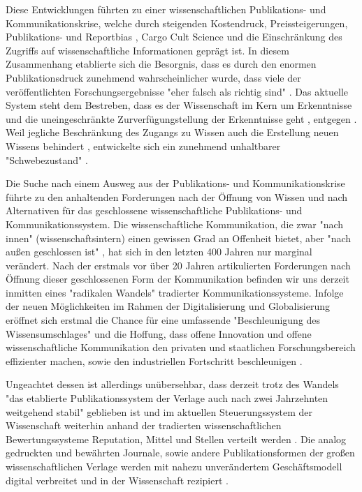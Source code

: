 Diese Entwicklungen führten zu einer wissenschaftlichen Publikations- und Kommunikationskrise, welche durch steigenden Kostendruck, Preissteigerungen, Publikations- \cite{Egger_1997} \cite{Fanelli_2012} und Reportbias \cite{Chan_2008} \cite{Dickersin_2011}, Cargo Cult Science \cite{Feynman_1974} und die Einschränkung des Zugriffs auf wissenschaftliche Informationen \cite{Hess_2006} geprägt ist. In diesem Zusammenhang etablierte sich die Besorgnis, dass es durch den enormen Publikationsdruck zunehmend wahrscheinlicher wurde, dass viele der veröffentlichten Forschungsergebnisse "eher falsch als richtig sind" \cite{Ioannidis_2005}. Das aktuelle System steht dem Bestreben, dass es der Wissenschaft im Kern um Erkenntnisse und die uneingeschränkte Zurverfügungstellung der Erkenntnisse geht \cite{hanekop_2006}, entgegen \cite{offhaus_2012_institutionelle_repos}. Weil jegliche Beschränkung des Zugangs zu Wissen auch die Erstellung neuen Wissens behindert \cite{cite:5} \cite{cite:8} \cite{Luhmann1998}, entwickelte sich ein zunehmend unhaltbarer "Schwebezustand" \cite{suchen}. 

Die Suche nach einem Ausweg aus der Publikations- und Kommunikationskrise führte zu den anhaltenden Forderungen nach der Öffnung von Wissen und nach Alternativen für das geschlossene wissenschaftliche Publikations- und Kommunikationssystem. Die wissenschaftliche Kommunikation, die zwar "nach innen" (wissenschaftsintern) einen gewissen Grad an Offenheit bietet, aber "nach außen geschlossen ist" \cite{kelty_2004}, hat sich in den letzten 400 Jahren nur marginal verändert. Nach der erstmals vor über 20 Jahren artikulierten Forderungen nach Öffnung dieser geschlossenen Form der Kommunikation befinden wir uns derzeit inmitten eines "radikalen Wandels" \cite{poynder_2011_suber} tradierter Kommunikationssysteme. Infolge der neuen Möglichkeiten im Rahmen der Digitalisierung und Globalisierung \cite{mcluhan_1963_gutenberg} eröffnet sich erstmal die Chance für eine umfassende "Beschleunigung des Wissensumschlages" \cite{Wenzel_2003} und die Hoffung, dass offene Innovation und offene wissenschaftliche Kommunikation den privaten und staatlichen Forschungsbereich effizienter machen, sowie den industriellen Fortschritt beschleunigen \cite{cite:7}. 

Ungeachtet dessen ist allerdings unübersehbar, dass derzeit trotz des Wandels "das etablierte Publikationssystem der Verlage auch nach zwei Jahrzehnten weitgehend stabil" \cite{Hanekop_2014} geblieben ist und im aktuellen Steuerungssystem der Wissenschaft weiterhin anhand der tradierten wissenschaftlichen Bewertungssysteme Reputation, Mittel und Stellen verteilt werden \cite{cite:4}. Die analog gedruckten und bewährten Journale, sowie andere Publikationsformen der großen wissenschaftlichen Verlage werden mit nahezu unverändertem Geschäftsmodell digital verbreitet \cite{Hanekop_2014} \cite{boai_2012} und in der Wissenschaft rezipiert \cite{suchen}. 

